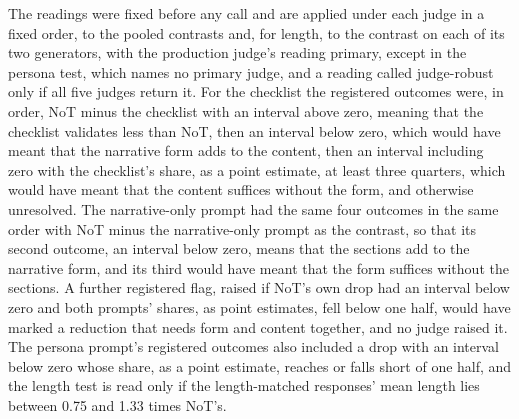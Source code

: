 The readings were fixed before any call and are applied under each judge in
a fixed order, to the pooled contrasts and, for length, to the contrast on
each of its two generators, with the production judge's reading primary,
except in the persona test, which names no primary judge, and a reading
called judge-robust only if all five judges return it. For the checklist the
registered outcomes were, in order, NoT minus the checklist with an interval
above zero, meaning that the checklist validates less than NoT, then an
interval below zero, which would have meant that the narrative form adds to
the content, then an interval including zero with the checklist's share, as
a point estimate, at least three quarters, which would have meant that the
content suffices without the form, and otherwise unresolved. The
narrative-only prompt had the same four outcomes in the same order with NoT
minus the narrative-only prompt as the contrast, so that its second outcome,
an interval below zero, means that the sections add to the narrative form,
and its third would have meant that the form suffices without the sections.
A further registered flag, raised if NoT's own drop had an interval below
zero and both prompts' shares, as point estimates, fell below one half, would
have marked a reduction that needs form and content together, and no judge
raised it. The persona prompt's registered outcomes also included a drop with
an interval below zero whose share, as a point estimate, reaches or falls
short of one half, and the length test is read only if the length-matched
responses' mean length lies between 0.75 and 1.33 times NoT's.

